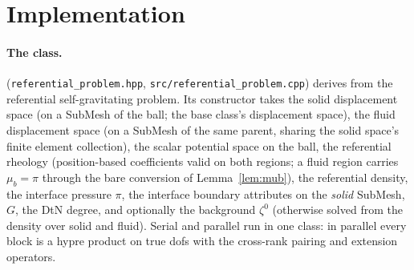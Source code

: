 \documentclass[11pt]{article}
\begin{document}
\section{Implementation}
\label{sec:impl}

\paragraph{The class.}
\texttt{}
(\texttt{referential\_problem.hpp}, \texttt{src/referential\_problem.cpp})
derives from the referential self-gravitating problem. Its constructor
takes the solid displacement space (on a SubMesh of the ball; the base
class's displacement space), the fluid displacement space (on a SubMesh
of the same parent, sharing the solid space's finite element
collection), the scalar potential space on the ball, the referential
rheology (position-based coefficients valid on both regions; a fluid
region carries $\mu_b = \pi$ through the bare conversion of
Lemma~\ref{lem:mub}), the referential density, the interface pressure
$\pi$, the interface boundary attributes on the \emph{solid} SubMesh,
$G$, the DtN degree, and optionally the background $\zeta^0$ (otherwise
solved from the density over solid and fluid). Serial and parallel run
in one class: in parallel every block is a hypre product on true dofs
with the cross-rank pairing and extension operators.
\end{document}
